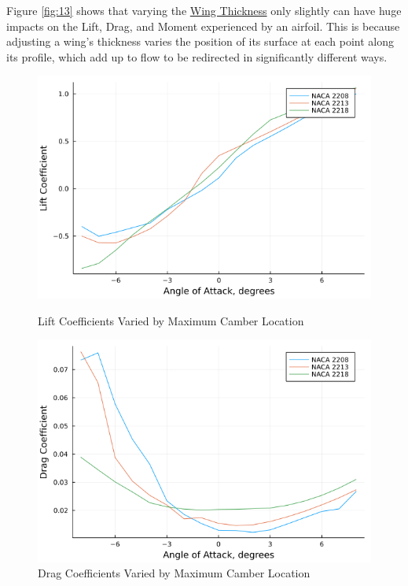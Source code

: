 \documentclass{article}
\begin{document}
Figure \ref{fig:13} shows that varying the \hyperlink{Th}{Wing Thickness} only slightly can have huge impacts on the Lift, Drag, and Moment experienced by an airfoil. This is because adjusting a wing's thickness varies the position of its surface at each point along its profile, which add up to flow to be redirected in significantly different ways.

\begin{figure}[!htb]
  \includegraphics[width=\linewidth]{Figure13.png}
  \caption{Lift Coefficients Varied by Maximum Camber Location}\label{fig:13}
\endminipage\hfill
{}
  \includegraphics[width=\linewidth]{Figure14.png}
  \caption{Drag Coefficients Varied by Maximum Camber Location}\label{fig:14}
\endminipage\hfill
{}

\end{figure}
\end{document}
